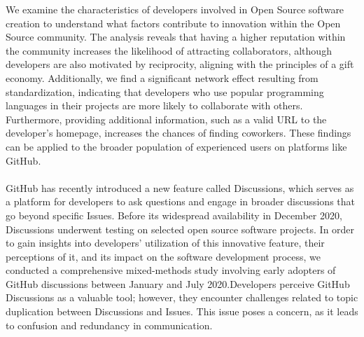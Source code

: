 We examine the characteristics of developers involved in Open Source software creation to understand what factors contribute to innovation within the Open Source community. The analysis reveals that having a higher reputation within the community increases the likelihood of attracting collaborators, although developers are also motivated by reciprocity, aligning with the principles of a gift economy. Additionally, we find a significant network effect resulting from standardization, indicating that developers who use popular programming languages in their projects are more likely to collaborate with others. Furthermore, providing additional information, such as a valid URL to the developer's homepage, increases the chances of finding coworkers. These findings can be applied to the broader population of experienced users on platforms like GitHub.\cite{celinska2018coding}\\\\
GitHub has recently introduced a new feature called Discussions, which serves as a platform for developers to ask questions and engage in broader discussions that go beyond specific Issues. Before its widespread availability in December 2020, Discussions underwent testing on selected open source software projects. In order to gain insights into developers' utilization of this innovative feature, their perceptions of it, and its impact on the software development process, we conducted a comprehensive mixed-methods study involving early adopters of GitHub discussions between January and July 2020.Developers perceive GitHub Discussions as a valuable tool; however, they encounter challenges related to topic duplication between Discussions and Issues. This issue poses a concern, as it leads to confusion and redundancy in communication.\cite{hata2022github}